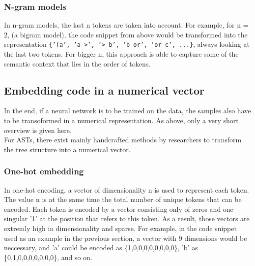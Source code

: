 \documentclass[
	a4paper,
	pagesize,
	pdftex,
	12pt,
	twoside, %
	BCOR=5mm, %
	ngerman,
	fleqn,
	final,
	]{scrartcl}
\begin{document}
\subsubsection{N-gram models}\label{n-gram}
In n-gram models, the last n tokens are taken into account. For example, for n = 2, (a bigram model), the code snippet from above would be transformed into the representation \texttt{\{'(a', 'a >', '> b', 'b or', 'or c', ...\}}, always looking at the last two tokens. For bigger n, this approach is able to capture some of the semantic context that lies in the order of tokens.

\subsection{Embedding code in a numerical vector}
In the end, if a neural network is to be trained on the data, the samples also have to be transoformed in a numerical representation. As above, only a very short overview is given here.\\
For ASTs, there exist mainly handcrafted methods by researchers to transform the tree structure into a numerical vector.
\subsubsection{One-hot embedding}\label{one-hot}
In one-hot encoding, a vector of dimensionality n is used to represent each token. The value n is at the same time the total number of unique tokens that can be encoded. Each token is encoded by a vector consisting only of zeros and one singular '1' at the position that refers to this token. As a result, those vectors are extremly high in dimensionality and sparse. For example, in the code snippet used as an example in the previous section, a vector with 9 dimensions would be neccessary, and 'a' could be encoded as \{1,0,0,0,0,0,0,0,0\}, 'b' as \{0,1,0,0,0,0,0,0,0\}, and so on.
\end{document}
